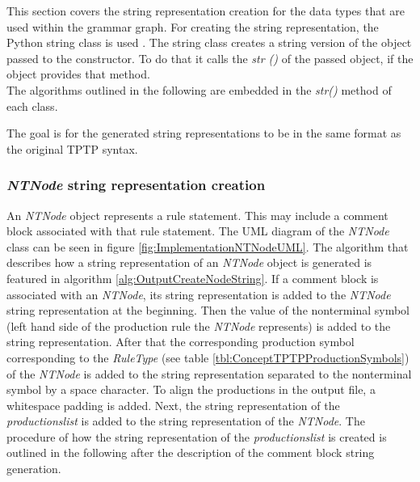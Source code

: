 This section covers the string representation creation for the data types that are used within the grammar graph.
For creating the string representation, the Python string class is used \cite{StringClass}. The string class creates a string version of the object passed to the constructor.
To do that it calls the \textit{\textunderscore \textunderscore str \textunderscore \textunderscore ()} of the passed object, if the object provides that method.\\
The algorithms outlined in the following are embedded in the \textit{\textunderscore \textunderscore str\textunderscore \textunderscore ()} method of each class.

The goal is for the generated string representations to be in the same format as the original \ac{TPTP} syntax.

\subsubsection{\textit{NTNode} string representation creation}

An \textit{NTNode} object represents a rule statement. This may include a comment block associated with that rule statement.
The UML diagram of the \textit{NTNode} class can be seen in figure \ref{fig:ImplementationNTNodeUML}.
The algorithm that describes how a string representation of an \textit{NTNode} object is generated is featured in algorithm \ref{alg:OutputCreateNodeString}.
If a comment block is associated with an \textit{NTNode}, its string representation is added to the \textit{NTNode} string representation at the beginning.
Then the value of the nonterminal symbol (left hand side of the production rule the \textit{NTNode} represents) is added to the string representation.
After that the corresponding production symbol corresponding to the \textit{RuleType} (see table \ref{tbl:ConceptTPTPProductionSymbols}) of the \textit{NTNode} is added to the string representation separated to the nonterminal symbol by a space character.
To align the productions in the output file, a whitespace padding is added.
Next, the string representation of the \textit{productions\textunderscore list} is added to the string representation of the \textit{NTNode}.
The procedure of how the string representation of the \textit{productions\textunderscore list} is created is outlined in the following after the description of the comment block string generation.

